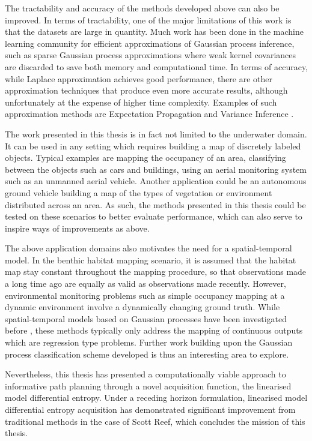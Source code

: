 		The tractability and accuracy of the methods developed above can also be improved. In terms of tractability, one of the major limitations of this work is that the datasets are large in quantity. Much work has been done in the machine learning community for efficient approximations of Gaussian process inference, such as sparse Gaussian process approximations where weak kernel covariances are discarded to save both memory and computational time. In terms of accuracy, while Laplace approximation achieves good performance, there are other approximation techniques that produce even more accurate results, although unfortunately at the expense of higher time complexity. Examples of such approximation methods are Expectation Propagation and Variance Inference \cite{GaussianProcessForMachineLearning}.
		
		The work presented in this thesis is in fact not limited to the underwater domain. It can be used in any setting which requires building a map of discretely labeled objects. Typical examples are mapping the occupancy of an area, classifying between the objects such as cars and buildings, using an aerial monitoring system such as an unmanned aerial vehicle. Another application could be an autonomous ground vehicle building a map of the types of vegetation or environment distributed across an area. As such, the methods presented in this thesis could be tested on these scenarios to better evaluate performance, which can also serve to inspire ways of improvements as above.
		
		The above application domains also motivates the need for a spatial-temporal model. In the benthic habitat mapping scenario, it is assumed that the habitat map stay constant throughout the mapping procedure, so that observations made a long time ago are equally as valid as observations made recently. However, environmental monitoring problems such as simple occupancy mapping at a dynamic environment involve a dynamically changing ground truth. While spatial-temporal models based on Gaussian processes have been investigated before \cite{Roman:SequentialBayesianOptimisation}, these methods typically only address the mapping of continuous outputs which are regression type problems. Further work building upon the Gaussian process classification scheme developed is thus an interesting area to explore.
		
		Nevertheless, this thesis has presented a computationally viable approach to informative path planning through a novel acquisition function, the linearised model differential entropy. Under a receding horizon formulation, linearised model differential entropy acquisition has demonstrated significant improvement from traditional methods in the case of Scott Reef, which concludes the mission of this thesis.

	